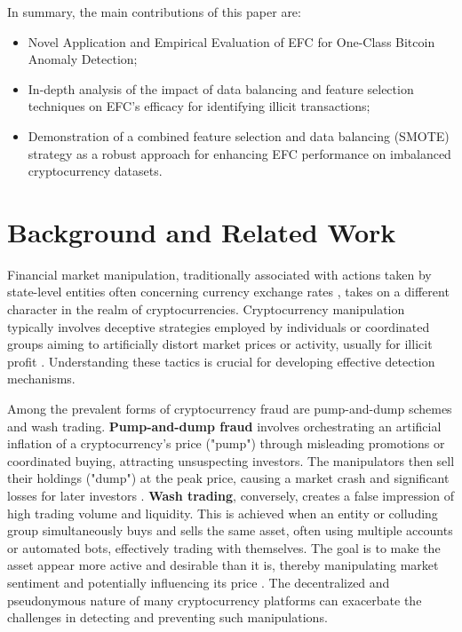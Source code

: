 \documentclass[12pt]{article}
\begin{document}
In summary, the main contributions of this paper are:

\begin{itemize}
    \item Novel Application and Empirical Evaluation of EFC for One-Class Bitcoin Anomaly Detection;
    \item In-depth analysis of the impact of data balancing and feature selection techniques on EFC's efficacy for
    identifying illicit transactions;
    \item Demonstration of a combined feature selection and data balancing (SMOTE) strategy as a robust approach for enhancing
    EFC performance on imbalanced cryptocurrency datasets.
\end{itemize}

\section{Background and Related Work} \label{sec:background}
Financial market manipulation, traditionally associated with actions taken by state-level entities often concerning currency
exchange rates \cite{domanski2011currency, market_manipulation_detection_2022}, takes on a different character in the realm
of cryptocurrencies. Cryptocurrency manipulation typically involves deceptive strategies employed by individuals or coordinated
groups aiming to artificially distort market prices or activity, usually for illicit profit \cite{cryptocurrency_arket_manipulation_2021}.
Understanding these tactics is crucial for developing effective detection mechanisms.

Among the prevalent forms of cryptocurrency fraud are pump-and-dump schemes and wash trading. \textbf{Pump-and-dump fraud}
involves orchestrating an artificial inflation of a cryptocurrency's price ("pump") through misleading promotions or coordinated
buying, attracting unsuspecting investors. The manipulators then sell their holdings ("dump") at the peak price, causing
a market crash and significant losses for later investors \cite{karim2018manipulation}. \textbf{Wash trading}, conversely,
creates a false impression of high trading volume and liquidity. This is achieved when an entity or colluding group
simultaneously buys and sells the same asset, often using multiple accounts or automated bots, effectively trading with
themselves. The goal is to make the asset appear more active and desirable than it is, thereby manipulating market sentiment
and potentially influencing its price \cite{gandal2018price, edelman2018detecting}. The decentralized and pseudonymous
nature of many cryptocurrency platforms can exacerbate the challenges in detecting and preventing such manipulations.
\end{document}

